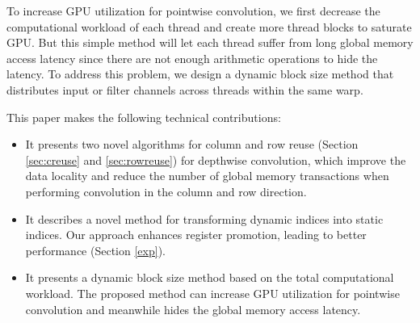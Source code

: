 To increase GPU utilization for pointwise convolution, we first decrease the computational workload of each thread and create more thread blocks to saturate GPU. 
But this simple method will let each thread suffer from long global memory access latency since there are not enough arithmetic operations to hide the latency.
To address this problem, we design a dynamic block size method that distributes input or filter channels across threads within the same warp. 

This paper makes the following technical contributions:
\begin{itemize}
    \item It presents two novel algorithms for column and row reuse (Section \ref{sec:creuse} and \ref{sec:rowreuse}) for depthwise convolution, which improve the data locality and reduce the number of global memory transactions when performing convolution in the column and row direction.
    \item It describes a novel method for transforming dynamic indices into static indices. 
    Our approach enhances register promotion, leading to better performance (Section \ref{exp}).
    \item It presents a dynamic block size method based on the total computational workload. The proposed method can increase GPU utilization for pointwise convolution and meanwhile hides the global memory access latency. 
\end{itemize}
